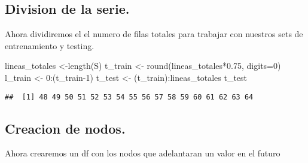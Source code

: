 \documentclass[
]{book}
\newenvironment{Shaded}{\begin{snugshade}}{\end{snugshade}}
\newcommand{\AttributeTok}[1]{\textcolor[rgb]{0.77,0.63,0.00}{#1}}
\newcommand{\DecValTok}[1]{\textcolor[rgb]{0.00,0.00,0.81}{#1}}
\newcommand{\FloatTok}[1]{\textcolor[rgb]{0.00,0.00,0.81}{#1}}
\newcommand{\FunctionTok}[1]{\textcolor[rgb]{0.00,0.00,0.00}{#1}}
\newcommand{\NormalTok}[1]{#1}
\newcommand{\OtherTok}[1]{\textcolor[rgb]{0.56,0.35,0.01}{#1}}
\newcommand{\SpecialCharTok}[1]{\textcolor[rgb]{0.00,0.00,0.00}{#1}}
\begin{document}
\hypertarget{division-de-la-serie.}{%
\subsection{Division de la serie.}\label{division-de-la-serie.}}

Ahora dividiremos el el numero de filas totales para trabajar con nuestros sets de entrenamiento y testing.

\begin{Shaded}
\begin{Highlighting}[]
\NormalTok{lineas\_totales }\OtherTok{\textless{}{-}}\FunctionTok{length}\NormalTok{(S)}
\NormalTok{t\_train }\OtherTok{\textless{}{-}} \FunctionTok{round}\NormalTok{(lineas\_totales}\SpecialCharTok{*}\FloatTok{0.75}\NormalTok{, }\AttributeTok{digits=}\DecValTok{0}\NormalTok{)}
\NormalTok{l\_train }\OtherTok{\textless{}{-}} \DecValTok{0}\SpecialCharTok{:}\NormalTok{(t\_train}\DecValTok{{-}1}\NormalTok{) }
\NormalTok{t\_test }\OtherTok{\textless{}{-}}\NormalTok{ (t\_train)}\SpecialCharTok{:}\NormalTok{lineas\_totales}
\NormalTok{t\_test}
\end{Highlighting}
\end{Shaded}

\begin{verbatim}
##  [1] 48 49 50 51 52 53 54 55 56 57 58 59 60 61 62 63 64
\end{verbatim}

\hypertarget{creacion-de-nodos.}{%
\subsection{Creacion de nodos.}\label{creacion-de-nodos.}}

Ahora crearemos un df con los nodos que adelantaran un valor en el futuro
\end{document}
